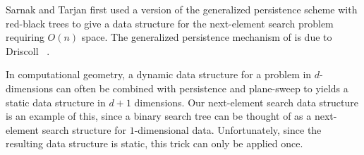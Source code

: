 Sarnak and Tarjan \cite{st86} first used a version of the generalized
persistence scheme with red-black trees to give a data structure for
the next-element search problem requiring $O(n)$ space.  The
generalized persistence mechanism of 
is due to Driscoll \etal\ \cite{dsst89}.

In computational geometry, a dynamic data structure for a problem in
$d$-dimensions can often be combined with persistence and plane-sweep
to yields a static data structure in $d+1$ dimensions.  Our next-element
search data structure is an example of this, since a binary search tree
can be thought of as a next-element search structure for $1$-dimensional
data.  Unfortunately, since the resulting data structure is static,
this trick can only be applied once.







